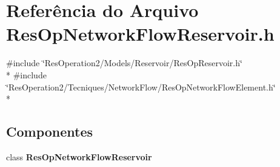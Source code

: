 \section{Referência do Arquivo Res\+Op\+Network\+Flow\+Reservoir.\+h}
\label{_res_op_network_flow_reservoir_8h}
{\ttfamily \#include \char`\"{}Res\+Operation2/\+Models/\+Reservoir/\+Res\+Op\+Reservoir.\+h\char`\"{}}\\*
{\ttfamily \#include \char`\"{}Res\+Operation2/\+Tecniques/\+Network\+Flow/\+Res\+Op\+Network\+Flow\+Element.\+h\char`\"{}}\\*
\subsection*{Componentes}
\begin{DoxyCompactItemize}
\item 
class {\bf Res\+Op\+Network\+Flow\+Reservoir}
\end{DoxyCompactItemize}
